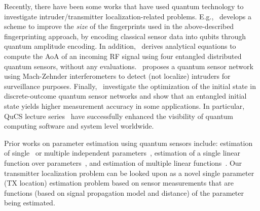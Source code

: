 Recently, there have been some works that have used quantum technology to investigate
intruder/transmitter localization-related problems. E.g.,~\cite{lcn22-qloc} develops a scheme
to improve the {\em size} of the fingerprints used in the above-described 
fingerprinting approach, by encoding classical sensor data into qubits 
through quantum amplitude encoding.
In addition,~\cite{PR22-quantum_positioning} derives analytical equations to compute the AoA of an
incoming RF signal using four entangled distributed quantum sensors, without any evaluations.~\cite{qsn-detection} proposes a quantum sensor network 
using Mach-Zehnder interferometers to detect (not localize) 
intruders for surveillance purposes.
Finally,~\cite{Hillery_2023,qsn-acm-23} investigate the optimization of the initial state in discrete-outcome quantum sensor networks and show that an entangled initial state yields
higher measurement accuracy in some applications.
In particular, QuCS lecture series~\cite{zhiding2023} have successfully enhanced the visibility of quantum computing software and system level worldwide.

Prior works on parameter estimation using quantum sensors
include: estimation of single~\cite{Giovannetti_2011} %
or multiple independent parameters~\cite{mpe_2018}, estimation of a single linear function over parameters~\cite{Altenburg_2019}, and estimation of multiple linear functions~\cite{Rubio_2020}. Our transmitter localization problem can be looked upon
as a novel single parameter (TX location) estimation problem based on sensor measurements that are functions (based on signal propagation model and distance) of the parameter being estimated.
